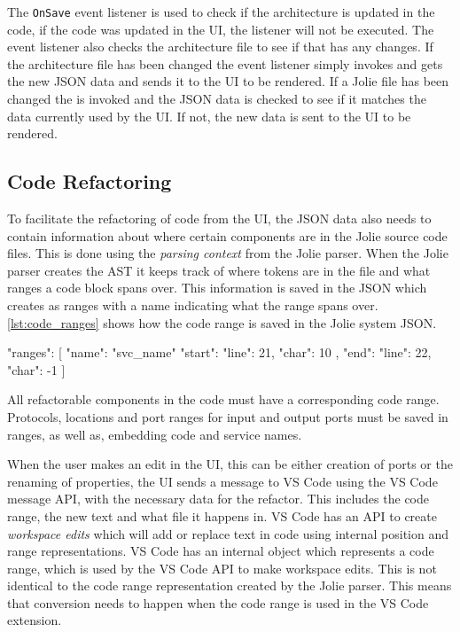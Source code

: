 The \texttt{OnSave} event listener is used to check if the architecture is updated in the code, if the code was updated in the UI, the listener will not be executed. The event listener also checks the architecture file to see if that has any changes.
If the architecture file has been changed the event listener simply invokes \nodetoolname[] and gets the new JSON data and sends it to the UI to be rendered.
If a Jolie file has been changed the \nodetoolname[] is invoked and the JSON data is checked to see if it matches the data currently used by the UI. If not, the new data is sent to the UI to be rendered.

\subsection{Code Refactoring}
To facilitate the refactoring of code from the UI, the JSON data also needs to contain information about where certain components are in the Jolie source code files.
This is done using the \textit{parsing context} from the Jolie parser. When the Jolie parser creates the AST it keeps track of where tokens are in the file and what ranges a code block spans over.
This information is saved in the JSON which \javatoolname[] creates as ranges with a name indicating what the range spans over.
\cref{lst:code_ranges} shows how the code range is saved in the Jolie system JSON.

\begin{jsonlisting}[][caption={JSON representing a code range created by the Jolie parser}, label={lst:code_ranges}]
{
    "ranges": [
        {
            "name": "svc_name"
            "start": {
                "line": 21,
                "char": 10
            },
            "end": {
                "line": 22,
                "char": -1
            }
        }
    ]
}
\end{jsonlisting}

All refactorable components in the code must have a corresponding code range. Protocols,
locations and port ranges for input and output ports must be saved in ranges, as well as, embedding code and service names.

When the user makes an edit in the UI, this can be either creation of ports or the renaming of properties, the UI sends a message to VS Code using the VS Code message API, with the necessary data for the refactor. This includes
the code range, the new text and what file it happens in. VS Code has an API to create \textit{workspace edits} which will add or replace text in code using internal position and range representations.
VS Code has an internal object which represents a code range, which is used by the VS Code API to make workspace edits. This is not identical to the code range representation created by the Jolie parser.
This means that conversion needs to happen when the code range is used in the VS Code extension.

